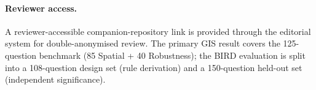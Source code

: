 \documentclass[11pt]{article}
\begin{document}
\paragraph{Reviewer access.} A reviewer-accessible companion-repository link is
provided through the editorial system for double-anonymised review. The primary
GIS result covers the 125-question benchmark (85 Spatial + 40 Robustness); the
BIRD evaluation is split into a 108-question design set (rule derivation) and a
150-question held-out set (independent significance).
\end{document}
